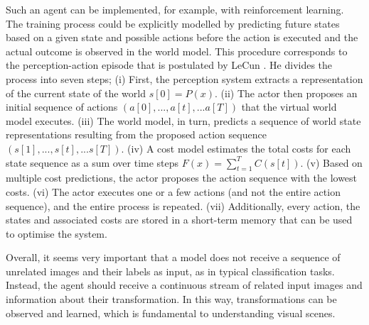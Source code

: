 Such an agent can be implemented, for example, with reinforcement learning.
The training process could be explicitly modelled by predicting future states based on a given state and possible actions before the action is executed and the actual outcome is observed in the world model.
This procedure corresponds to the perception-action episode that is postulated by LeCun .
He divides the process into seven steps;
(i) First, the perception system extracts a representation of the current state of the world $s[0]=P(x)$. (ii) The actor then proposes an initial sequence of actions $(a[0], ..., a[t], ... a[T])$ that the virtual world model executes. (iii) The world model, in turn, predicts a sequence of world state representations resulting from the proposed action sequence $(s[1], ..., s[t], ... s[T])$. (iv) A cost model estimates the total costs for each state sequence as a sum over time steps $F(x)=\sum_{t=1}^{T}C(s[t])$. (v) Based on multiple cost predictions, the actor proposes the action sequence with the lowest costs. (vi) The actor executes one or a few actions (and not the entire action sequence), and the entire process is repeated. (vii) Additionally, every action, the states and associated costs are stored in a short-term memory that can be used to optimise the system.

Overall, it seems very important that a model does not receive a sequence of unrelated images and their labels as input, as in typical classification tasks. Instead, the agent should receive a continuous stream of related input images and information about their transformation. In this way, transformations can be observed and learned, which is fundamental to understanding visual scenes.

